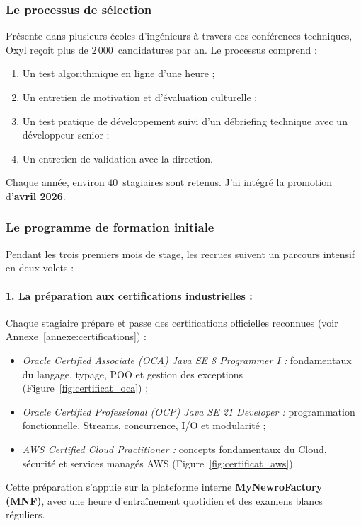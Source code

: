 \documentclass{tnreport}
\begin{document}
\subsubsection{Le processus de sélection}
Présente dans plusieurs écoles d'ingénieurs à travers des conférences techniques, Oxyl reçoit plus de $2\,000$~candidatures par an. Le processus comprend :
\begin{enumerate}
    \item Un test algorithmique en ligne d'une heure ;
    \item Un entretien de motivation et d'évaluation culturelle ;
    \item Un test pratique de développement suivi d'un débriefing technique avec un développeur senior ;
    \item Un entretien de validation avec la direction.
\end{enumerate}
Chaque année, environ $40$~stagiaires sont retenus. J'ai intégré la promotion d'\textbf{avril 2026}.

\subsubsection{Le programme de formation initiale}
Pendant les trois premiers mois de stage, les recrues suivent un parcours intensif en deux volets :

\paragraph{1. La préparation aux certifications industrielles :}
Chaque stagiaire prépare et passe des certifications officielles reconnues (voir Annexe~\ref{annexe:certifications}) :
\begin{itemize}
    \item \textit{Oracle Certified Associate (OCA) Java SE 8 Programmer I :} fondamentaux du langage, typage, POO et gestion des exceptions (Figure~\ref{fig:certificat_oca}) ;
    \item \textit{Oracle Certified Professional (OCP) Java SE 21 Developer :} programmation fonctionnelle, Streams, concurrence, I/O et modularité ;
    \item \textit{AWS Certified Cloud Practitioner :} concepts fondamentaux du Cloud, sécurité et services managés AWS (Figure~\ref{fig:certificat_aws}).
\end{itemize}
Cette préparation s'appuie sur la plateforme interne \textbf{MyNewroFactory (MNF)}, avec une heure d'entraînement quotidien et des examens blancs réguliers.
\end{document}
